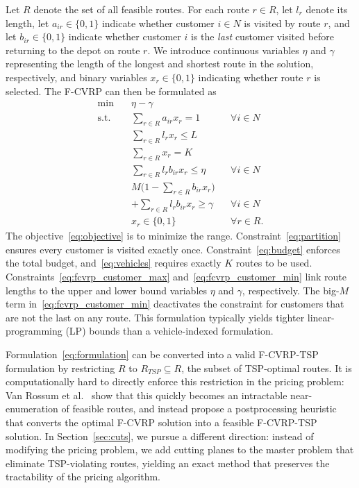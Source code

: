 \documentclass[a4paper,fleqn]{cas-dc}%
\newcommand{\CitetVR}[1]{Van Rossum et al.\ \cite{#1}}
\begin{document}
Let $R$ denote the set of all feasible routes. For each route $r \in R$, let $l_r$ denote its length, let $a_{ir} \in \{0,1\}$ indicate whether customer $i \in N$ is visited by route $r$, and let $b_{ir} \in \{0,1\}$ indicate whether customer $i$ is the \emph{last} customer visited before returning to the depot on route $r$. We introduce continuous variables $\eta$ and $\gamma$ representing the length of the longest and shortest route in the solution, respectively, and binary variables $x_r \in \{0,1\}$ indicating whether route $r$ is selected. The F-CVRP can then be formulated as
\begin{subequations}
\begin{align}
\min \quad & \eta - \gamma \label{eq:objective} \\
\text{s.t.} \quad  & \sum_{r \in R} a_{ir} x_{r}  = 1 && \forall i \in N \label{eq:partition} \\
& \sum_{r \in R} l_r x_{r} \leq L \label{eq:budget} \\
& \sum_{r \in R} x_{r} = K \label{eq:vehicles} \\
& \sum_{r \in R} l_r b_{ir} x_r \leq \eta && \forall i \in N \label{eq:fcvrp_customer_max} \\
& M \bigl(1 - \sum_{r \in R} b_{ir} x_r \bigr) \nonumber \\
& + \sum_{r \in R} l_r b_{ir} x_r \geq \gamma && \forall i \in N \label{eq:fcvrp_customer_min} \\
& x_{r} \in \{0, 1\} && \forall r \in R. \label{eq:domain}
\end{align}
\label{eq:formulation}
\end{subequations}
The objective~\eqref{eq:objective} is to minimize the range. Constraint~\eqref{eq:partition} ensures every customer is visited exactly once. Constraint~\eqref{eq:budget} enforces the total budget, and~\eqref{eq:vehicles} requires exactly $K$ routes to be used. Constraints~\eqref{eq:fcvrp_customer_max} and~\eqref{eq:fcvrp_customer_min} link route lengths to the upper and lower bound variables $\eta$ and $\gamma$, respectively. The big-$M$ term in~\eqref{eq:fcvrp_customer_min} deactivates the constraint for customers that are not the last on any route. This formulation typically yields tighter linear-programming (LP) bounds than a vehicle-indexed formulation.

Formulation~\eqref{eq:formulation} can be converted into a valid F-CVRP-TSP formulation by restricting $R$ to $R_{TSP} \subseteq R$, the subset of TSP-optimal routes. It is computationally hard to directly enforce this restriction in the pricing problem: \CitetVR{rossum2025efficient} show that this quickly becomes an intractable near-enumeration of feasible routes, and instead propose a postprocessing heuristic that converts the optimal F-CVRP solution into a feasible F-CVRP-TSP solution. In Section~\ref{sec:cuts}, we pursue a different direction: instead of modifying the pricing problem, we add cutting planes to the master problem that eliminate TSP-violating routes, yielding an exact method that preserves the tractability of the pricing algorithm.
\end{document}

